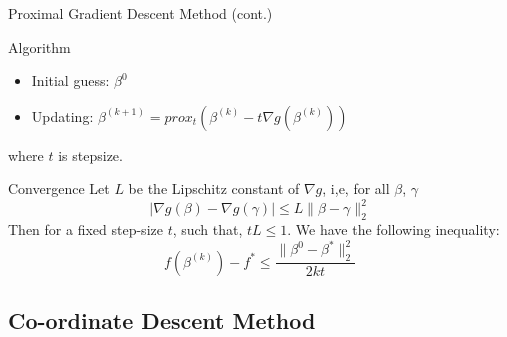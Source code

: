 \documentclass[tikz]{beamer}					%
\begin{document}
{
\begin{frame}{Proximal Gradient Descent Method (cont.)}
\begin{block}{Algorithm}
    \begin{itemize}
        \item Initial guess: $\beta^0$
        \item Updating: $\beta^{(k+1)} = prox_t\left(\beta^{(k)}-t\nabla g(\beta^{(k)})\right)$
    \end{itemize}
\end{block}
where $t$ is stepsize.
\begin{block}{Convergence}
    Let $L$ be the Lipschitz constant of $\nabla g$, i,e, for all $\beta$, $\gamma$
    \begin{equation}
        |\nabla g(\beta)-\nabla g(\gamma)| \leq L\|\beta - \gamma\|^2_2
    \end{equation}
    Then for a fixed step-size $t$, such that, $tL\leq 1$. We have the following inequality:
    \begin{equation}
        f(\beta^{(k)}) - f^* \leq \frac{\|\beta^0 - \beta^*\|^2_2}{2kt}
    \end{equation}
\end{block}
\end{frame}
}

\subsection{Co-ordinate Descent Method}
\end{document}
